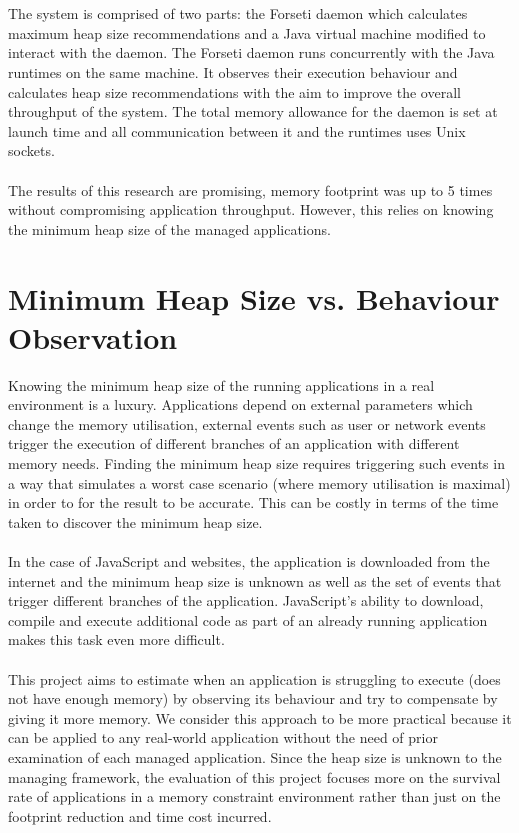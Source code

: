 \documentclass{l4proj}
\begin{document}
\\\\
\hspace*{3em} The system is comprised of two parts: the Forseti daemon which calculates maximum heap size recommendations and a Java virtual machine modified to interact with the daemon. The Forseti daemon runs concurrently with the Java runtimes on the same machine. It observes their execution behaviour and calculates heap size recommendations with the aim to improve the overall throughput of the system. The total memory allowance for the daemon is set at launch time and all communication between it and the runtimes uses Unix sockets.\cite{forseti}
\\\\
\hspace*{3em} The results of this research are promising, memory footprint was up to 5 times without compromising application throughput. However, this relies on knowing the minimum heap size of the managed applications. 
\section{Minimum Heap Size vs. Behaviour Observation}
\label{noheapsize}
\hspace*{3em} Knowing the minimum heap size of the running applications in a real environment is a luxury. Applications depend on external parameters which change the memory utilisation, external events such as user or network events trigger the execution of different branches of an application with different memory needs. Finding the minimum heap size requires triggering such events in a way that simulates a worst case scenario (where memory utilisation is maximal) in order to for the result to be accurate. This can be costly in terms of the time taken to discover the minimum heap size. 
\\\\
\hspace*{3em}  In the case of JavaScript and websites, the application is downloaded from the internet and the minimum heap size is unknown as well as the set of events that trigger different branches of the application. JavaScript's ability to download, compile and execute additional code as part of an already running application makes this task even more difficult. 
\\\\
\hspace*{3em} This project aims to estimate when an application is struggling to execute (does not have enough memory) by observing its behaviour and try to compensate by giving it more memory. We consider this approach to be more practical because it can be applied to any real-world application without the need of prior examination of each managed application. Since the heap size is unknown to the managing framework, the evaluation of this project focuses more on the survival rate of applications in a memory constraint environment rather than just on the footprint reduction and time cost incurred.
\end{document}
